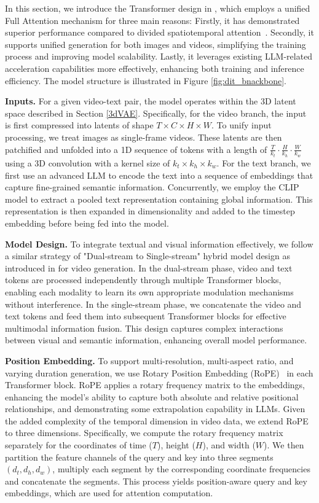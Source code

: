 In this section, we introduce the Transformer design in \nameofmethod{}, which employs a unified Full Attention mechanism for three main reasons:
Firstly, it has demonstrated superior performance compared to divided spatiotemporal attention~\cite{videoworldsimulators2024,polyak2024movie,yang2024cogvideox,genmo2024mochi}.
Secondly, it supports unified generation for both images and videos, simplifying the training process and improving model scalability.
Lastly, it leverages existing LLM-related acceleration capabilities more effectively, enhancing both training and inference efficiency.
The model structure is illustrated in Figure \ref{fig:dit_bnackbone}.

\textbf{Inputs.} For a given video-text pair, the model operates within the 3D latent space described in Section \ref{3dVAE}. Specifically, for the video branch, the input is first compressed into latents of shape $T \times C \times H \times W$. To unify input processing, we treat images as single-frame videos. These latents are then patchified and unfolded into a 1D sequence of tokens with a length of $\frac{T}{k_t} \cdot \frac{H}{k_h} \cdot \frac{W}{k_w}$ using a 3D convolution with a kernel size of $k_t \times k_h \times k_w$. For the text branch, we first use an advanced LLM to encode the text into a sequence of embeddings that capture fine-grained semantic information. Concurrently, we employ the CLIP model to extract a pooled text representation containing global information. This representation is then expanded in dimensionality and added to the timestep embedding before being fed into the model.

\textbf{Model Design.}  To integrate textual and visual information effectively, we follow a similar strategy of "Dual-stream to Single-stream" hybrid model design as introduced in \cite{FLUX} for video generation. In the dual-stream phase, video and text tokens are processed independently through multiple Transformer blocks, enabling each modality to learn its own appropriate modulation mechanisms without interference. In the single-stream phase, we concatenate the video and text tokens and feed them into subsequent Transformer blocks for effective multimodal information fusion. This design captures complex interactions between visual and semantic information, enhancing overall model performance.

\textbf{Position Embedding.} To support multi-resolution, multi-aspect ratio, and varying duration generation, we use Rotary Position Embedding (RoPE)~\cite{su2023roformer} in each Transformer block. RoPE applies a rotary frequency matrix to the embeddings, enhancing the model's ability to capture both absolute and relative positional relationships, and demonstrating some extrapolation capability in LLMs. Given the added complexity of the temporal dimension in video data, we extend RoPE to three dimensions. Specifically, we compute the rotary frequency matrix separately for the coordinates of time ($T$), height ($H$), and width ($W$). We then partition the feature channels of the query and key into three segments $(d_t, d_h, d_w)$, multiply each segment by the corresponding coordinate frequencies and concatenate the segments. This process yields position-aware query and key embeddings, which are used for attention computation.


